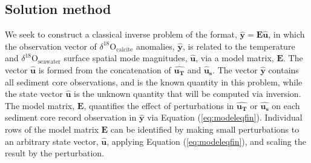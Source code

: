 \documentclass[draft]{agujournal2019}
\begin{document}
\subsection{Solution method \label{sec:solution}}
We seek to construct a classical inverse problem of the format, $\mathbf{\hat{y}} = \mathbf{E\hat{u}}$, in which the observation vector of $\delta^{18}\mathrm{O}_{\mathrm{calcite}}$ anomalies, $\mathbf{\hat{y}}$, is related to the temperature and $\delta^{18}\mathrm{O}_{\mathrm{seawater}}$ surface spatial mode magnitudes, $\mathbf{\hat{u}}$, via a model matrix, $\mathbf{E}$. The vector $\mathbf{\hat{u}}$ is formed from the concatenation of $\mathbf{\hat{u_{T}}}$ and $\mathbf{\hat{u}_{s}}$. The vector $\mathbf{\hat{y}}$ contains all sediment core observations, and is the known quantity in this problem, while the state vector $\mathbf{\hat{u}}$ is the unknown quantity that will be computed via inversion. The model matrix, $\mathbf{E}$, quantifies the effect of perturbations in $\mathbf{\hat{u_{T}}}$ or $\mathbf{\hat{u_{s}}}$ on each sediment core record observation in $\mathbf{\hat{y}}$ via Equation (\ref{eq:modeleqfin}). Individual rows of the model matrix $\mathbf{E}$ can be identified by making small perturbations to an arbitrary state vector, $\mathbf{\hat{u}}$, applying Equation (\ref{eq:modeleqfin}), and scaling the result by the perturbation.
\end{document}

